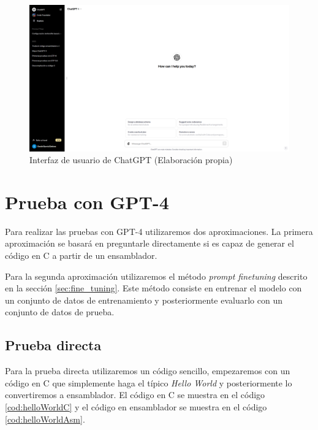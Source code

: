 \begin{figure}[H]
    \begin{center}
      \includegraphics[scale=0.3]{figuras/Capitulo_05/InterfazChatGPT.png}
    \end{center}
    \caption[Interfaz de usuario de ChatGPT]{Interfaz de usuario de ChatGPT (Elaboración propia)}
    \label{fig:interfaz_chatgpt}
\end{figure}

\section{Prueba con GPT-4}
\label{sec:prueba_gpt4}


Para realizar las pruebas con GPT-4 utilizaremos dos aproximaciones. La primera aproximación
se basará en preguntarle directamente si es capaz de generar el código en C a partir de un
ensamblador.

Para la segunda aproximación utilizaremos el método \textit{prompt finetuning} descrito en
la sección \ref{sec:fine_tuning}. Este método consiste en entrenar el modelo con un conjunto
de datos de entrenamiento y posteriormente evaluarlo con un conjunto de datos de prueba.

\subsection{Prueba directa}
\label{subsec:prueba_directa}


Para la prueba directa utilizaremos un código sencillo, empezaremos con un código en C
que simplemente haga el típico \textit{Hello World} y posteriormente lo convertiremos a
ensamblador. El código en C se muestra en el código \ref{cod:helloWorldC} y el código
en ensamblador se muestra en el código \ref{cod:helloWorldAsm}.

